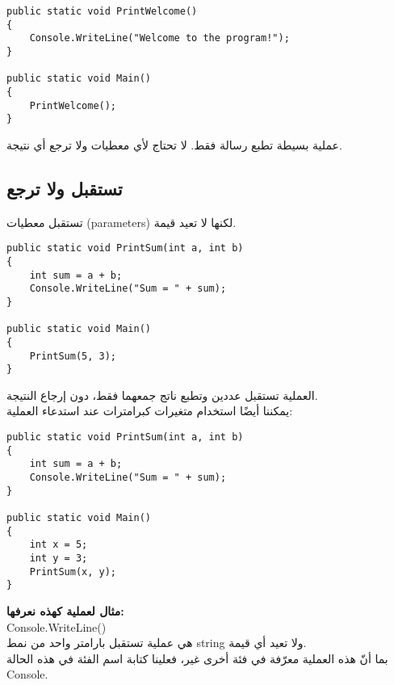 \documentclass[12pt]{article}
\begin{document}
\begin{boxExample}
\begin{english}
\begin{verbatim}
public static void PrintWelcome()
{
    Console.WriteLine("Welcome to the program!");
}

public static void Main()
{
    PrintWelcome();
}
\end{verbatim}
\end{english}
\end{boxExample}

عملية بسيطة تطبع رسالة فقط. لا تحتاج لأي معطيات ولا ترجع أي نتيجة.

\subsection{تستقبل ولا ترجع}
تستقبل معطيات (parameters) لكنها لا تعيد قيمة.

\begin{boxExample}[1]
\begin{english}
\begin{verbatim}
public static void PrintSum(int a, int b)
{
    int sum = a + b;
    Console.WriteLine("Sum = " + sum);
}

public static void Main()
{
    PrintSum(5, 3);
}
\end{verbatim}
\end{english}
\end{boxExample}

العملية تستقبل عددين وتطبع ناتج جمعهما فقط، دون إرجاع النتيجة. \\

يمكننا أيضًا استخدام متغيرات كبرامترات عند استدعاء العملية:
\begin{boxExample}[2]
\begin{english}
\begin{verbatim}
public static void PrintSum(int a, int b)
{
    int sum = a + b;
    Console.WriteLine("Sum = " + sum);
}

public static void Main()
{
    int x = 5;
    int y = 3;
    PrintSum(x, y);
}
\end{verbatim}
\end{english}
\end{boxExample}

\textbf{مثال لعملية كهذه نعرفها:} \\
\textenglish{Console.WriteLine()} \\
هي عملية تستقبل بارامتر واحد من نمط \textenglish{string} ولا تعيد أي قيمة. \\
بما أنّ هذه العملية معرّفة في فئة أخرى غير، فعلينا كتابة اسم الفئة في هذه الحالة \textenglish{Console}.
\end{document}
